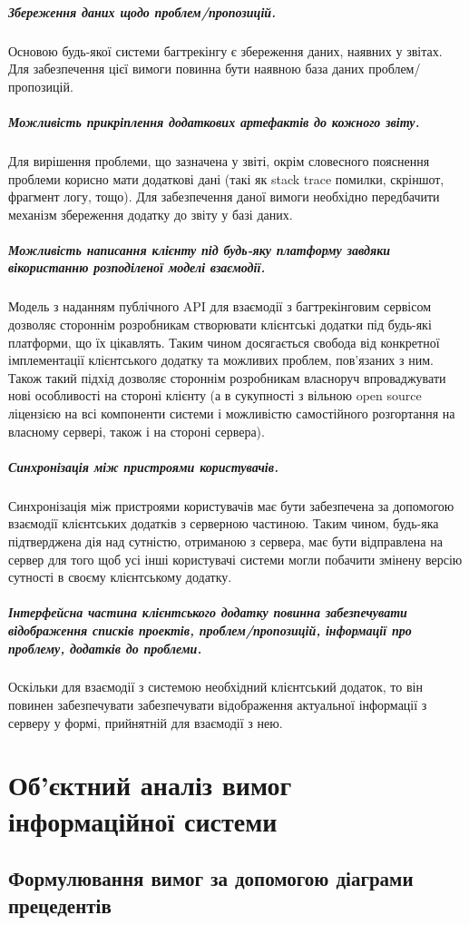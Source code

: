 \documentclass[../main.tex]{subfiles}
\begin{document}
\subparagraph{Збереження даних щодо проблем/пропозицій.}
Основою будь-якої системи багтрекінгу є збереження даних, наявних у звітах. Для забезпечення цієї вимоги повинна бути наявною база даних проблем/пропозицій.

\subparagraph{Можливість прикріплення додаткових артефактів до кожного звіту.}
Для вирішення проблеми, що зазначена у звіті, окрім словесного пояснення проблеми корисно мати додаткові дані (такі як stack trace помилки, скріншот, фрагмент логу, тощо). Для забезпечення даної вимоги необхідно передбачити механізм збереження додатку до звіту у базі даних.

\subparagraph{Можливість написання клієнту під будь-яку платформу завдяки вікористанню розподіленої моделі взаємодії.}
Модель з наданням публічного API для взаємодії з багтрекінговим сервісом дозволяє стороннім розробникам створювати клієнтські додатки під будь-які платформи, що їх цікавлять. Таким чином досягається свобода від конкретної імплементації клієнтського додатку та можливих проблем, пов'язаних з ним. Також такий підхід дозволяє стороннім розробникам власноруч впроваджувати нові особливості на стороні клієнту (а в сукупності з вільною open source ліцензією на всі компоненти системи і можливістю самостійного розгортання на власному сервері, також і на стороні сервера).

\subparagraph{Синхронізація між пристроями користувачів.}
Синхронізація між пристроями користувачів має бути забезпечена за допомогою взаємодії клієнтських додатків з серверною частиною. Таким чином, будь-яка підтверджена дія над сутністю, отриманою з сервера, має бути відправлена на сервер для того щоб усі інші користувачі системи могли побачити змінену версію сутності в своєму клієнтському додатку.

\subparagraph{Інтерфейсна частина клієнтського додатку повинна забезпечувати відображення списків проектів, проблем/пропозицій, інформації про проблему, додатків до проблеми.}
Оскільки для взаємодії з системою необхідний клієнтський додаток, то він повинен забезпечувати забезпечувати відображення актуальної інформації з серверу у формі, прийнятній для взаємодії з нею.

\section{Об'єктний аналіз вимог інформаційної системи}

\subsection{Формулювання вимог за допомогою діаграми прецедентів}
\end{document}
